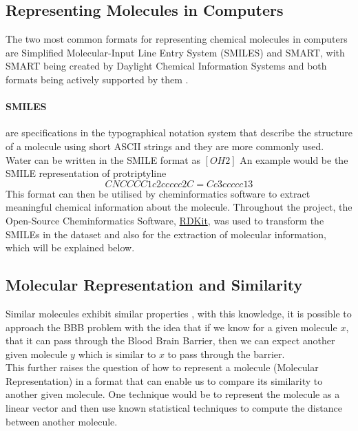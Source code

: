 \documentclass[a4paper,12pt]{report}
\begin{document}
		\subsection{Representing Molecules in Computers}
		The two most common formats for representing chemical molecules in computers are Simplified Molecular-Input Line Entry System (SMILES) and SMART, with SMART being created by Daylight Chemical Information Systems and both formats being actively supported by them \cite{OpenBabel2017}.
			\paragraph{SMILES} are specifications in the typographical notation system that describe the structure of a molecule using short ASCII strings and they are more commonly used. Water can be written in the SMILE format as $[OH2]$ An example would be the SMILE representation of protriptyline
				\begin{equation*}
					CNCCCC1c2ccccc2C=Cc3ccccc13
				\end{equation*}
			This format can then be utilised by cheminformatics software to extract meaningful chemical information about the molecule. Throughout the project, the Open-Source Cheminformatics Software, \href{www.rdkit.org}{RDKit}, was used to transform the SMILEs in the dataset and also for the extraction of molecular information, which will be explained below.
		\subsection{Molecular Representation and Similarity}
		Similar molecules exhibit similar properties \cite{JohnMaggiora1990}, with this knowledge, it is possible to approach the BBB problem with the idea that if we know for a given molecule $x$, that it can pass through the Blood Brain Barrier, then we can expect another given molecule $y$ which is similar to $x$ to pass through the barrier. \\
		This further raises the question of how to represent a molecule (Molecular Representation) in a format that can enable us to compare its similarity to another given molecule. One technique would be to represent the molecule as a linear vector and then use known statistical techniques to compute the distance between another molecule. 
\end{document}
